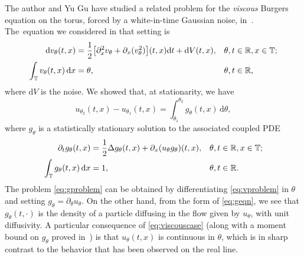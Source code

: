 \documentclass[AHL,Unicode,longabstracts]{cedram}
\newcounter{setofcase}
\newcounter{case}[setofcase]
\newcommand*\TT{\mathbb{T}}
\newcommand*\RR{\mathbb{R}}
\newcommand*\dif{\mathrm{d}}
\let\oldin\in
\renewcommand{\in}{\mathchoice{\oldin}{\oldin}{\,\oldin\,}{\,\oldin\,}}
\let\originalleft\left
\let\originalright\right
\renewcommand{\left}{\mathopen{}\mathclose\bgroup\originalleft}
\renewcommand{\right}{\aftergroup\egroup\originalright}
\newcommand*\TT{\mathbb{T}}
\newcommand*\RR{\mathbb{R}}
\begin{document}
The author and Yu Gu have studied a related problem for the \emph{viscous} Burgers equation on the torus, forced by a white-in-time Gaussian noise, in~\cite{DG23}. The~equation we considered in that setting is
\begin{subequations}\label{eq:vproblem}
\begin{align}
\dif v_{\theta}(t,x) & =\frac{1}{2}\left[\partial_{x}^{2}v_{\theta}+\partial_{x}(v_{\theta}^{2})\right](t,x)\dif t+\dif V(t,x), && \theta,t\in\RR,x\in\TT;\label{eq:veqn-1}
\\
\int_{\TT}v_{\theta}(t,x)\,\dif x & =\theta, &&\theta,t\in\RR,\label{eq:vintegral}
\end{align}
\end{subequations}
where $\dif V$ is the noise. We showed that, at stationarity, we have
\begin{equation}\label{eq:viscouscase}
u_{\theta_{2}}(t,x)-u_{\theta_{1}}(t,x)=\int_{\theta_{1}}^{\theta_{2}}g_{\theta}(t,x)\,\dif\theta,
\end{equation}
where $g_{\theta}$ is a statistically stationary solution to the associated coupled PDE
\begin{subequations}\label{eq:gproblem}
\begin{align}
\partial_{t}g_{\theta}(t,x) & =\frac{1}{2}\Delta g_{\theta}(t,x)+\partial_{x}(u_{\theta}g_{\theta})(t,x), &&\theta,t\in\RR,x\in\TT;\label{eq:geqn}
\\
\int_{\TT}g_{\theta}(t,x)\,\dif x & =1, &&\theta,t\in\RR.\label{eq:gintegral}
\end{align}
\end{subequations}
The problem \eqref{eq:gproblem} can be obtained by differentiating
\eqref{eq:vproblem} in $\theta$ and setting $g_{\theta}=\partial_{\theta}u_{\theta}$. On the other hand, from the form of \eqref{eq:geqn}, we see that $g_{\theta}(t,\cdot)$ is the density of a particle diffusing in the flow given by $u_{\theta}$, with unit diffusivity. A particular consequence of \eqref{eq:viscouscase} (along with a moment bound on $g_{\theta}$ proved in~\cite{DG23}) is that $u_{\theta}(t,x)$ is continuous in $\theta$, which is in sharp contrast to the behavior that has been observed on the real line.
\end{document}

